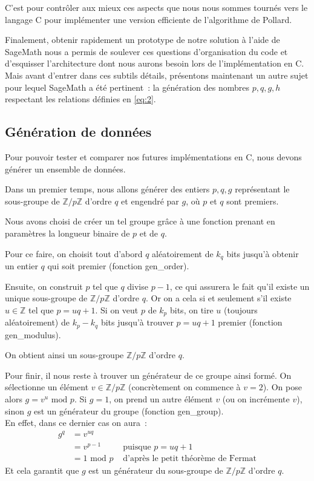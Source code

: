         C'est pour contrôler aux mieux ces aspects que nous nous sommes tournés vers le langage C pour implémenter une version efficiente de l'algorithme de Pollard.

        Finalement, obtenir rapidement un prototype de notre solution à l'aide de SageMath nous a permis de soulever ces questions d'organisation du code et d'esquisser l'architecture dont nous aurons besoin lors de l'implémentation en C.
        Mais avant d'entrer dans ces subtils détails, présentons maintenant un autre sujet pour lequel SageMath a été pertinent~: la génération des nombres $p, q, g, h$ respectant les relations définies en \eqref{eq:2}.

        \subsection{Génération de données}
        Pour pouvoir tester et comparer nos futures implémentations en C, nous devons générer un ensemble de données.

        Dans un premier temps, nous allons générer des entiers $p, q, g$ représentant le sous-groupe de $\mathbb{Z}/p\mathbb{Z}$ d'ordre $q$ et engendré par $g$, où $p$ et $q$ sont premiers.

        Nous avons choisi de créer un tel groupe grâce à une fonction prenant en paramètres la longueur binaire de $p$ et de $q$.

		    Pour ce faire, on choisit tout d'abord $q$ aléatoirement de $k_q$ bits jusqu'à obtenir un entier $q$ qui soit premier (fonction gen\_order).

		    Ensuite, on construit $p$ tel que $q$ divise $p - 1$, ce qui assurera le fait qu'il existe un unique sous-groupe de $\mathbb{Z}/p\mathbb{Z}$ d'ordre $q$. Or on a cela si et seulement s'il existe $u \in\mathbb{Z}$ tel que $p = uq + 1$. Si on veut $p$ de $k_p$ bits, on tire $u$ (toujours aléatoirement) de $k_p - k_q$ bits jusqu'à trouver $p = uq + 1$ premier (fonction gen\_modulus).

		    On obtient ainsi un sous-groupe $\mathbb{Z}/p\mathbb{Z}$ d'ordre $q$.

		    Pour finir, il nous reste à trouver un générateur de ce groupe ainsi formé. On sélectionne un élément $v \in \mathbb{Z}/p\mathbb{Z}$ (concrètement on commence à $v = 2$). On pose alors $g = v^u \text{ mod } p$. Si $g = 1$, on prend un autre élément $v$ (ou on incrémente $v$), sinon $g$ est un générateur du groupe (fonction gen\_group).\\
		    En effet, dans ce dernier cas on aura~:
		    \begin{align*}
		    g^q & = v^{uq} \\
            & = v^{p-1} & \text{ puisque } p = uq + 1 \\
            & = 1 \text{ mod } p & \text{ d'après le petit théorème de Fermat}
		    \end{align*}
		    Et cela garantit que $g$ est un générateur du sous-groupe de $\mathbb{Z}/p\mathbb{Z}$ d'ordre $q$.\\

